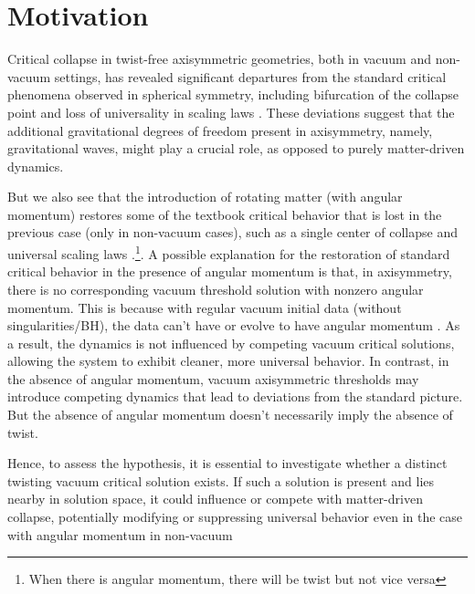 \section*{Motivation}
Critical collapse in twist-free axisymmetric geometries, both in vacuum and non-vacuum settings, has revealed significant departures from the standard critical phenomena observed in spherical symmetry, including bifurcation of the collapse point and loss of universality in scaling laws \cite{baumgarte_2018}. These deviations suggest that the additional gravitational degrees of freedom present in axisymmetry, namely, gravitational waves, might play a crucial role, as opposed to purely matter-driven dynamics. 

But we also see that the introduction of rotating matter (with angular momentum) restores some of the textbook critical behavior that is lost in the previous case (only in non-vacuum cases), such as a single center of collapse and universal scaling laws \cite{marouda_cors_rüter_vaño-viñuales_hilditch}.\footnote{When there is angular momentum, there will be twist but not vice versa}. A possible explanation for the restoration of standard critical behavior in the presence of angular momentum is that, in axisymmetry, there is no corresponding vacuum threshold solution with nonzero angular momentum. This is because with regular vacuum initial data (without singularities/BH), the data can't have or evolve to have angular momentum \cite{marouda_cors_rüter_vaño-viñuales_hilditch}. As a result, the dynamics is not influenced by competing vacuum critical solutions, allowing the system to exhibit cleaner, more universal behavior. In contrast, in the absence of angular momentum, vacuum axisymmetric thresholds may introduce competing dynamics that lead to deviations from the standard picture. But the absence of angular momentum doesn't necessarily imply the absence of twist.

Hence, to assess the hypothesis, it is essential to investigate whether a distinct twisting vacuum critical solution exists. If such a solution is present and lies nearby in solution space, it could influence or compete with matter-driven collapse, potentially modifying or suppressing universal behavior even in the case with angular momentum in non-vacuum

